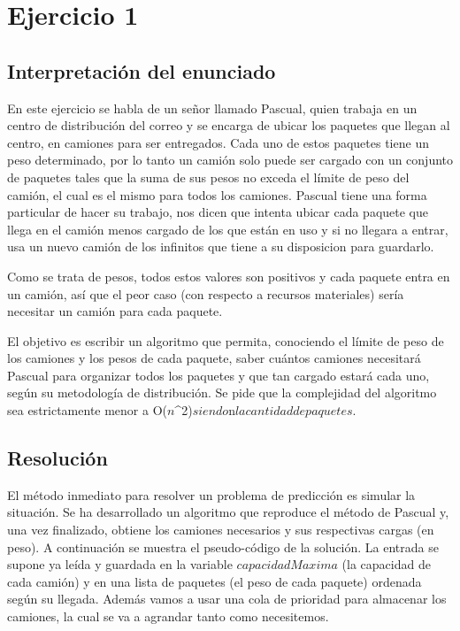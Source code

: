 \section{Ejercicio 1}

\subsection{Interpretación del enunciado}
\par{En este ejercicio se habla de un señor llamado Pascual, quien trabaja en un centro de distribución del correo y se encarga de ubicar los paquetes que llegan al centro, en camiones para ser entregados. Cada uno de estos paquetes tiene un peso determinado, por lo tanto un cami\'on solo puede ser cargado con un conjunto de paquetes tales que la suma de sus pesos no exceda el l\'imite de peso del cami\'on, el cual es el mismo para todos los camiones. Pascual tiene una forma particular de hacer su trabajo, nos dicen que intenta ubicar cada paquete que llega en el camión menos cargado de los que est\'an en uso y si no llegara a entrar, usa un nuevo camión de los infinitos que tiene a su disposicion para guardarlo.}
\par{Como se trata de pesos, todos estos valores son positivos y cada paquete entra en un camión, así que el peor caso (con respecto a recursos materiales) sería necesitar un camión para cada paquete.}
\par{El objetivo es escribir un algoritmo que permita, conociendo el l\'imite de peso de los camiones y los pesos de cada paquete, saber cu\'antos camiones necesitar\'a Pascual para organizar todos los paquetes y que tan cargado estar\'a cada uno, seg\'un su metodolog\'ia de distribuci\'on. Se pide que la complejidad del algoritmo sea estrictamente menor a O($n$^{2})$ siendo $n$ la cantidad de paquetes$.}


\subsection{Resolución}
\par{El m\'etodo inmediato para resolver un problema de predicci\'on es simular la situaci\'on. Se ha desarrollado un algoritmo que reproduce el m\'etodo de Pascual y, una vez finalizado, obtiene los camiones necesarios y sus respectivas cargas (en peso). A continuaci\'on se muestra el pseudo-código de la solución. La entrada se supone ya leída y guardada en la variable $capacidadMaxima$ (la capacidad de cada cami\'on) y en una lista de paquetes (el peso de cada paquete) ordenada según su llegada. Además vamos a usar una cola de prioridad para almacenar los camiones, la cual se va a agrandar tanto como necesitemos.}

